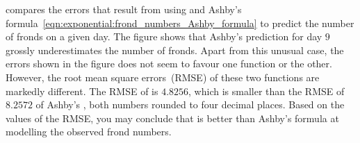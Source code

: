 \documentclass[a4paper,oneside,12pt]{article}
\begin{document}
\begin{problem}
{\begin{solution}
 compares the errors that
result from using
 and
Ashby's formula~\eqref{eqn:exponential:frond_numbers_Ashby_formula} to
predict the number of fronds on a given day.  The figure shows that
Ashby's prediction for day $9$ grossly underestimates the number of
fronds.  Apart from this unusual case, the errors shown in the figure
does not seem to favour one function or the other.  However, the root
mean square errors~(RMSE) of these two functions are markedly
different.  The RMSE of
 is
$4.8256$, which is smaller than the RMSE of $8.2572$ of Ashby's
, both numbers
rounded to four decimal places.  Based on the values of the RMSE, you
may conclude that
 is
better than Ashby's formula at modelling the observed frond numbers.
\end{solution}
}{}


\end{problem}
\end{document}
